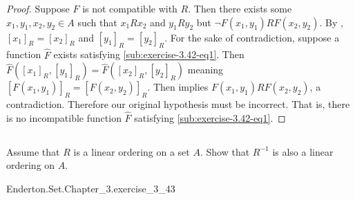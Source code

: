 \documentclass{report}
\begin{document}
\begin{proof}
    \suitdivider

    \noindent
    Suppose $F$ is not compatible with $R$.
    Then there exists some $x_1, y_1, x_2, y_2 \in A$ such that $x_1Rx_2$ and
      $y_1Ry_2$ but $\neg F(x_1, y_1)RF(x_2, y_2)$.
    By , $[x_1]_R = [x_2]_R$ and $[y_1]_R = [y_2]_R$.
    For the sake of contradiction, suppose a function $\hat{F}$ exists
      satisfying \eqref{sub:exercise-3.42-eq1}.
    Then $\hat{F}([x_1]_R, [y_1]_R) = \hat{F}([x_2]_R, [y_2]_R)$ meaning
      $[F(x_1, y_1)]_R = [F(x_2, y_2)]_R$.
    Then  implies $F(x_1, y_1)RF(x_2, y_2)$, a
      contradiction.
    Therefore our original hypothesis must be incorrect.
    That is, there is no incompatible function $\hat{F}$ satisfying
      \eqref{sub:exercise-3.42-eq1}.

  \end{proof}

\subsection{}%

  Assume that $R$ is a linear ordering on a set $A$.
  Show that $R^{-1}$ is also a linear ordering on $A$.

    {Enderton.Set.Chapter\_3.exercise\_3\_43}
\end{document}
